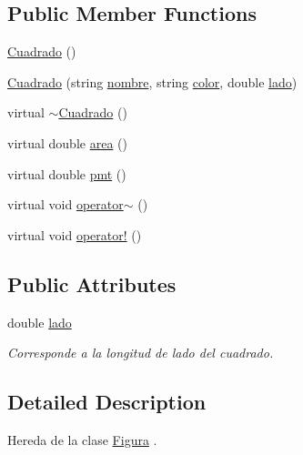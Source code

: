 \subsection*{Public Member Functions}
\begin{DoxyCompactItemize}
\item 
\hyperlink{class_cuadrado_ad28d9dddc29e1987ec620b07b0a4acc9}{Cuadrado} ()
\item 
\hyperlink{class_cuadrado_afb489ccf7f7b4e2837d080bee5f6656a}{Cuadrado} (string \hyperlink{class_figura_a5be336617ed8a4d4f28115297b38da02}{nombre}, string \hyperlink{class_figura_a9f519b9504b95440f124a3099070e952}{color}, double \hyperlink{class_cuadrado_a0480679f3e1c059282f532167c81d439}{lado})
\item 
virtual \hyperlink{class_cuadrado_a9f5bf29c9b8368ad45a4a3c12f9fd7c2}{$\sim$\+Cuadrado} ()
\item 
virtual double \hyperlink{class_cuadrado_a379a755de0b95f295e30e6049e19426c}{area} ()
\item 
virtual double \hyperlink{class_cuadrado_ace7ee6909f89aeb0797a135a03be4fe4}{pmt} ()
\item 
virtual void \hyperlink{class_cuadrado_a6303f81de8d357f415d00a116b73a6fc}{operator$\sim$} ()
\item 
virtual void \hyperlink{class_cuadrado_a78be5dcef640ad7f82858f44fb623af5}{operator!} ()
\end{DoxyCompactItemize}
\subsection*{Public Attributes}
\begin{DoxyCompactItemize}
\item 
double \hyperlink{class_cuadrado_a0480679f3e1c059282f532167c81d439}{lado}
\begin{DoxyCompactList}\small\item\em Corresponde a la longitud de lado del cuadrado. \end{DoxyCompactList}\end{DoxyCompactItemize}


\subsection{Detailed Description}
Hereda de la clase \hyperlink{class_figura}{Figura} . 

